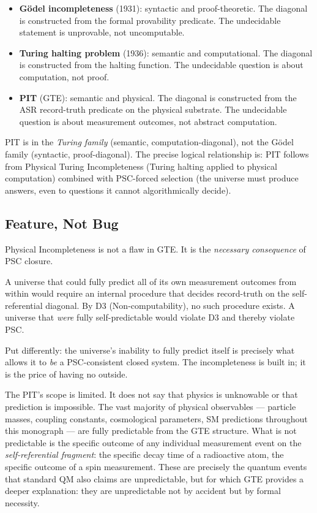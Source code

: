 \documentclass[11pt,openany]{book}
\theoremstyle{remark}
\begin{document}
\begin{itemize}

\item \textbf{G\"{o}del incompleteness} (1931): syntactic and proof-theoretic.  The
  diagonal is constructed from the formal provability predicate.  The undecidable
  statement is unprovable, not uncomputable.

\item \textbf{Turing halting problem} (1936): semantic and computational.  The
  diagonal is constructed from the halting function.  The undecidable question is
  about computation, not proof.

\item \textbf{PIT} (GTE): semantic and physical.  The diagonal is constructed from the
  ASR record-truth predicate on the physical substrate.  The undecidable question is
  about measurement outcomes, not abstract computation.

\end{itemize}

PIT is in the \emph{Turing family} (semantic, computation-diagonal), not the G\"{o}del
family (syntactic, proof-diagonal).  The precise logical relationship is:
PIT follows from Physical Turing Incompleteness (Turing halting applied to physical
computation) combined with PSC-forced selection (the universe must produce answers, even
to questions it cannot algorithmically decide).

\subsection*{Feature, Not Bug}

Physical Incompleteness is not a flaw in GTE.  It is the \emph{necessary consequence}
of PSC closure.

A universe that could fully predict all of its own measurement outcomes from within
would require an internal procedure that decides record-truth on the self-referential
diagonal.  By D3 (Non-computability), no such procedure exists.  A universe that
\emph{were} fully self-predictable would violate D3 and thereby violate PSC.

Put differently: the universe's inability to fully predict itself is precisely what
allows it to \emph{be} a PSC-consistent closed system.  The incompleteness is built in;
it is the price of having no outside.

The PIT's scope is limited.  It does not say that physics is unknowable or that
prediction is impossible.  The vast majority of physical observables --- particle masses,
coupling constants, cosmological parameters, SM predictions throughout this monograph ---
are fully predictable from the GTE structure.  What is not predictable is the specific
outcome of any individual measurement event on the \emph{self-referential fragment}: the
specific decay time of a radioactive atom, the specific outcome of a spin measurement.
These are precisely the quantum events that standard QM also claims are unpredictable,
but for which GTE provides a deeper explanation: they are unpredictable not by accident
but by formal necessity.
\end{document}
